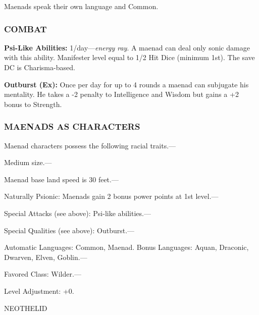 \documentclass{article}
\begin{document}
Maenads speak their own language and Common.

\subsubsection*{COMBAT}

\textbf{Psi-Like Abilities:} 1/day---\textit{energy ray}. A maenad can deal only 
sonic damage with this ability. Manifester level equal to 1/2 Hit Dice (minimum 
1st). The save DC is Charisma-based.

\textbf{Outburst (Ex): }Once per day for up to 4 rounds a maenad can subjugate 
his mentality. He takes a -2 penalty to Intelligence and Wisdom but gains a +2 
bonus to Strength.

\subsubsection*{MAENADS AS CHARACTERS}

Maenad characters possess the following racial traits.---

Medium size.---

Maenad base land speed is 30 feet.---

Naturally Psionic: Maenads gain 2 bonus power points at 1st level.--- 

\parindent=3pt
Special Attacks (see above): Psi-like abilities.---

\parindent=0pt
Special Qualities (see above): Outburst.---

Automatic Languages: Common, Maenad. Bonus Languages: Aquan, Draconic, Dwarven, 
Elven, Goblin.---

Favored Class: Wilder.---

Level Adjustment: +0.

\vspace{12pt}
{\LARGE{}NEOTHELID}
\end{document}
